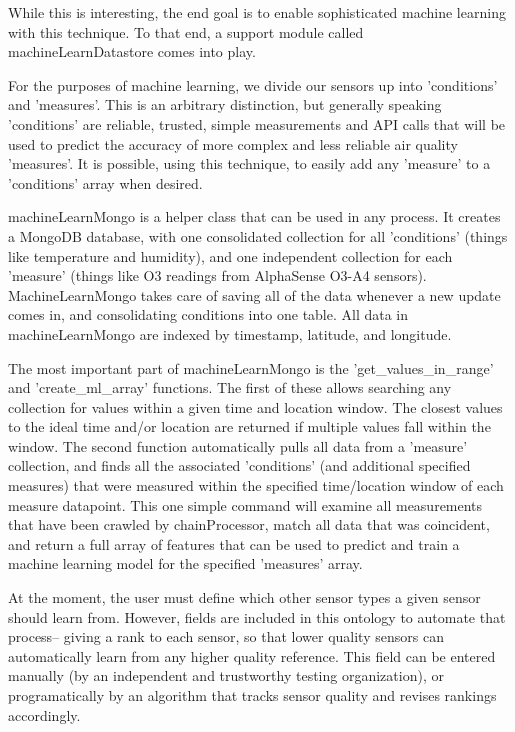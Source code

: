 While this is interesting, the end goal is to enable sophisticated machine learning with this technique.  To that end, a support module called machineLearnDatastore comes into play.

For the purposes of machine learning, we divide our sensors up into 'conditions' and 'measures'.  This is an arbitrary distinction, but generally speaking 'conditions' are reliable, trusted, simple measurements and API calls that will be used to predict the accuracy of more complex and less reliable air quality 'measures'.  It is possible, using this technique, to easily add any 'measure' to a 'conditions' array when desired.

machineLearnMongo is a helper class that can be used in any process.  It creates a MongoDB database, with one consolidated collection for all 'conditions' (things like temperature and humidity), and one independent collection for each 'measure' (things like O3 readings from AlphaSense O3-A4 sensors).  MachineLearnMongo takes care of saving all of the data whenever a new update comes in, and consolidating conditions into one table.  All data in machineLearnMongo are indexed by timestamp, latitude, and longitude.  

The most important part of machineLearnMongo is the 'get\_values\_in\_range' and 'create\_ml\_array' functions.  The first of these allows searching any collection for values within a given time and location window.  The closest values to the ideal time and/or location are returned if multiple values fall within the window.  The second function automatically pulls all data from a 'measure' collection, and finds all the associated 'conditions' (and additional specified measures) that were measured within the specified time/location window of each measure datapoint.  This one simple command will examine all measurements that have been crawled by chainProcessor, match all data that was coincident, and return a full array of features that can be used to predict and train a machine learning model for the specified 'measures' array.  

At the moment, the user must define which other sensor types a given sensor should learn from.  However, fields are included in this ontology to automate that process-- giving a rank to each sensor, so that lower quality sensors can automatically learn from any higher quality reference.  This field can be entered manually (by an independent and trustworthy testing organization), or programatically by an algorithm that tracks sensor quality and revises rankings accordingly.

